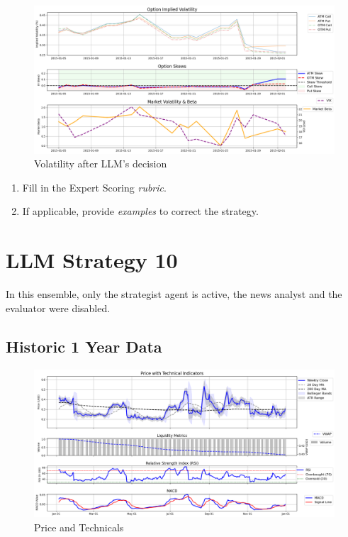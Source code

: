 \documentclass[8pt]{scrartcl}
\begin{document}
\begin{figure}[H]
    \centering
    \includegraphics[width=1\linewidth]{judge_reviews/AAPL_M_gpt-4o-mini/2015-01-05/llm_Market_Volatility_&_Beta.png}
    \caption{Volatility after LLM's decision}
\end{figure}

\begin{tcolorbox}[colback=blue!10, colframe=blue!60, title=\textbf{TASKS}, sharp corners=southwest]
\begin{enumerate}
    \item Fill in the Expert Scoring \textit{rubric}.
    \item If applicable, provide \textit{examples} to correct the strategy.
\end{enumerate}
\end{tcolorbox}
\newpage


\section*{LLM Strategy 10}
\label{app:s10}

In this ensemble, only the strategist agent is active, the news analyst and the evaluator were disabled.

\subsection*{Historic 1 Year Data}

\begin{figure}[H]
    \centering
    \includegraphics[width=1\linewidth]{judge_reviews//META_M_gpt-4o-mini/2016-01-04/judge_Price_with_Technical_Indicators.png}
    \caption{Price and Technicals}
\end{figure}
\end{document}

